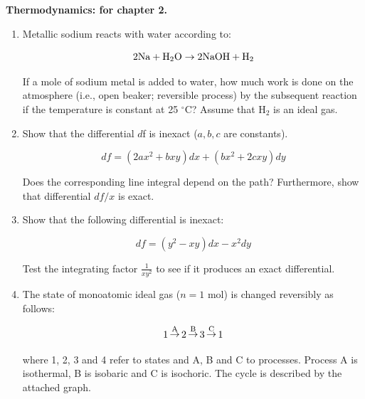 \noindent
\textbf{Thermodynamics:
 for chapter 2.}\\

\begin{enumerate}

\item Metallic sodium reacts with water according to:

$$2\textnormal{Na} + \textnormal{H}_2\textnormal{O} \rightarrow 2\textnormal{NaOH} + \textnormal{H}_2$$

If a mole of sodium metal is added to water, how much work is done on the atmosphere (i.e., open beaker; reversible process) by the subsequent reaction if the temperature is constant at 25 $^\circ$C? Assume that H$_2$ is an ideal gas.


\item Show that the differential $d$f is inexact ($a,b,c$ are constants).

$$df = \left(2ax^2 + bxy\right)dx + \left(bx^2 + 2cxy\right)dy$$

Does the corresponding line integral depend on the path? Furthermore, show that differential $df / x$ is exact.


\item Show that the following differential is inexact:

$$df = \left(y^2 - xy\right)dx - x^2dy$$

Test the integrating factor $\frac{1}{xy^2}$ to see if it produces an exact differential.


\item The state of monoatomic ideal gas ($n = 1$ mol) is changed reversibly as follows:

$$1 \mathop\rightarrow\limits^{\textnormal{A}} 2 \mathop\rightarrow\limits^{\textnormal{B}} 3 \mathop\rightarrow\limits^{\textnormal{C}} 1$$

where 1, 2, 3 and 4 refer to states and A, B and C to processes. Process A is isothermal, B is isobaric and C is isochoric. The cycle is described by the attached graph.


\end{enumerate}

